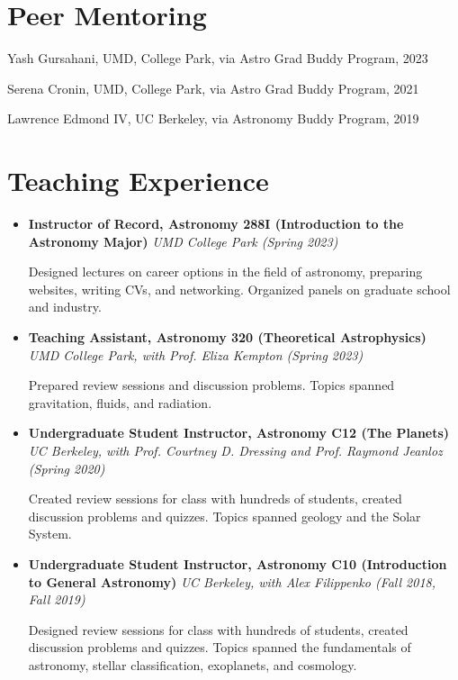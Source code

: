 \documentclass[letterpaper,12pt]{article}
\newcommand{\shorterSection}[1]{\section{#1}}
\renewcommand{\small}{\normalsize}
\newcommand{\resumeItem}[2]{
  \item\small{
    \textbf{#1}{#2 \vspace{-2pt}}
  }
}
\newcommand{\resumeSubHeadingListStart}[1][]{\begin{itemize}[leftmargin=*,#1]}
\newcommand{\resumeSubHeadingListEnd}{\end{itemize}}
\newcommand{\resumeItemListStart}{\begin{itemize}}
\begin{document}
\shorterSection{Peer Mentoring}
\small
  \begin{list}{}{\cvlist}
  \item[{\color{numcolor}}]Yash Gursahani, UMD, College Park, via Astro Grad Buddy Program, 2023
  \item[{\color{numcolor}}]Serena Cronin, UMD, College Park, via Astro Grad Buddy Program, 2021 
  \item[{\color{numcolor}}]Lawrence Edmond IV, UC Berkeley, via Astronomy Buddy Program, 2019


  \end{list} 






\shorterSection{Teaching Experience}
\resumeItemListStart
\resumeItem{Instructor of Record, Astronomy 288I (Introduction to the Astronomy Major)}{ \textit{UMD College Park (Spring 2023)}}
    
    Designed lectures on career options in the field of astronomy, preparing websites, writing CVs, and networking. Organized panels on graduate school and industry. 
\resumeItem{Teaching Assistant, Astronomy 320 (Theoretical Astrophysics)}{ \textit{UMD College Park, with Prof. Eliza Kempton (Spring 2023)}}

Prepared review sessions and discussion problems. Topics spanned gravitation, fluids, and radiation.
\resumeItem{Undergraduate Student Instructor, Astronomy C12 (The Planets)}{ \textit{UC Berkeley, with Prof. Courtney D. Dressing and Prof. Raymond Jeanloz (Spring 2020)}}

Created review sessions for class with hundreds of students, created discussion problems and quizzes. Topics spanned geology and the Solar System.
\resumeItem{Undergraduate Student Instructor, Astronomy C10 (Introduction to General Astronomy)}{\textit{ UC Berkeley, with Alex Filippenko (Fall 2018, Fall 2019)}}

Designed review sessions for class with hundreds of students, created discussion problems and quizzes. Topics spanned the fundamentals of astronomy, stellar classification, exoplanets, and cosmology.
\resumeSubHeadingListEnd
\end{document}
